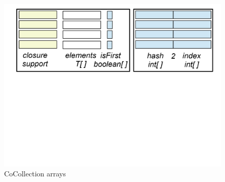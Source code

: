 \documentclass[
]{ceurart}
\begin{document}

\begin{figure}[b]
	\vspace{-10pt}
	\begin{center}
		\includegraphics[trim= 0 340 0 0,clip,width=5.0in]{CoCollection.png}
	\end{center}
	\vspace{-10pt}
	\caption{CoCollection arrays}
	\label{fig:CoCollectionContents}
	\vspace{-10pt}
\end{figure}


\end{document}
